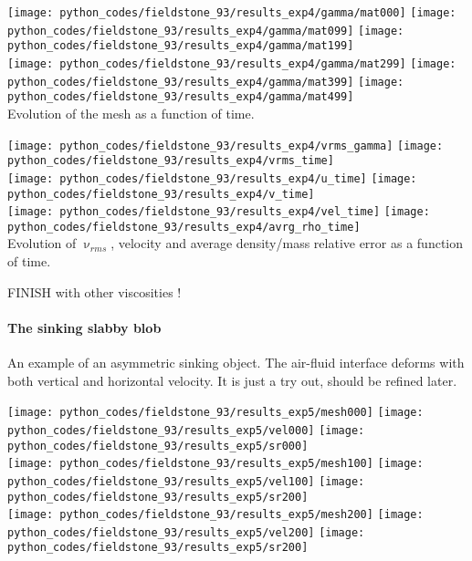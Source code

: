 \begin{center}
\texttt{[image: python\_codes/fieldstone\_93/results\_exp4/gamma/mat000]}
\texttt{[image: python\_codes/fieldstone\_93/results\_exp4/gamma/mat099]}
\texttt{[image: python\_codes/fieldstone\_93/results\_exp4/gamma/mat199]}\\
\texttt{[image: python\_codes/fieldstone\_93/results\_exp4/gamma/mat299]}
\texttt{[image: python\_codes/fieldstone\_93/results\_exp4/gamma/mat399]}
\texttt{[image: python\_codes/fieldstone\_93/results\_exp4/gamma/mat499]}\\
{\captionfont Evolution of the mesh as a function of time.}
\end{center} 



\begin{center}
\texttt{[image: python\_codes/fieldstone\_93/results\_exp4/vrms\_gamma]}
\texttt{[image: python\_codes/fieldstone\_93/results\_exp4/vrms\_time]}\\
\texttt{[image: python\_codes/fieldstone\_93/results\_exp4/u\_time]}
\texttt{[image: python\_codes/fieldstone\_93/results\_exp4/v\_time]}\\
\texttt{[image: python\_codes/fieldstone\_93/results\_exp4/vel\_time]}
\texttt{[image: python\_codes/fieldstone\_93/results\_exp4/avrg\_rho\_time]}\\
{\captionfont Evolution of $\upnu_{rms}$, velocity and average density/mass relative
error as a function of time.}
\end{center} 


FINISH with other viscosities !


\newpage
\paragraph{The sinking slabby blob}

An example of an asymmetric sinking object. The air-fluid interface deforms 
with both vertical and horizontal velocity. It is just a try out, should be refined later.

\begin{center}
\texttt{[image: python\_codes/fieldstone\_93/results\_exp5/mesh000]}
\texttt{[image: python\_codes/fieldstone\_93/results\_exp5/vel000]}
\texttt{[image: python\_codes/fieldstone\_93/results\_exp5/sr000]}\\
\texttt{[image: python\_codes/fieldstone\_93/results\_exp5/mesh100]}
\texttt{[image: python\_codes/fieldstone\_93/results\_exp5/vel100]}
\texttt{[image: python\_codes/fieldstone\_93/results\_exp5/sr200]}\\
\texttt{[image: python\_codes/fieldstone\_93/results\_exp5/mesh200]}
\texttt{[image: python\_codes/fieldstone\_93/results\_exp5/vel200]}
\texttt{[image: python\_codes/fieldstone\_93/results\_exp5/sr200]}
\end{center} 



